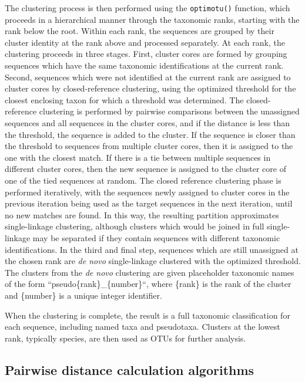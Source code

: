 \documentclass[
]{article}
\begin{document}
The clustering process is then performed using the \texttt{optimotu()} function, which proceeds in a hierarchical manner through the taxonomic ranks, starting with the rank below the root.
Within each rank, the sequences are grouped by their cluster identity at the rank above and processed separately.
At each rank, the clustering proceeds in three stages.
First, cluster cores are formed by grouping sequences which have the same taxonomic identifications at the current rank.
Second, sequences which were not identified at the current rank are assigned to cluster cores by closed-reference clustering, using the optimized threshold for the closest enclosing taxon for which a threshold was determined.
The closed-reference clustering is performed by pairwise comparisons between the unassigned sequences and all sequences in the cluster cores, and if the distance is less than the threshold, the sequence is added to the cluster.
If the sequence is closer than the threshold to sequences from multiple cluster cores, then it is assigned to the one with the closest match.
If there is a tie between multiple sequences in different cluster cores, then the new sequence is assigned to the cluster core of one of the tied sequences at random.
The closed reference clustering phase is performed iteratively, with the sequences newly assigned to cluster cores in the previous iteration being used as the target sequences in the next iteration, until no new matches are found.
In this way, the resulting partition approximates single-linkage clustering, although clusters which would be joined in full single-linkage may be separated if they contain sequences with different taxonomic identifications.
In the third and final step, sequences which are still unassigned at the chosen rank are \emph{de novo} single-linkage clustered with the optimized threshold.
The clusters from the \emph{de novo} clustering are given placeholder taxonomic names of the form ``pseudo\{rank\}\_\{number\}``, where \{rank\} is the rank of the cluster and \{number\} is a unique integer identifier.

When the clustering is complete, the result is a full taxonomic classification for each sequence, including named taxa and pseudotaxa.
Clusters at the lowest rank, typically species, are then used as OTUs for further analysis.

\subsection{Pairwise distance calculation algorithms}\label{pairwise-distance-calculation-algorithms}
\end{document}
